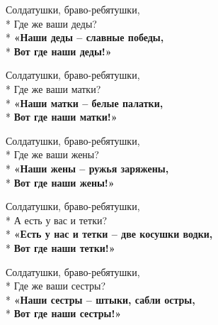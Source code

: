 \begin{minipage}{\linewidth}
Солдатушки, браво-ребятушки,\\*
Где же ваши деды?\\*
\textbf{«Наши деды – славные победы,}\\*
\textbf{Вот где наши деды!»}\\
\end{minipage}\par\medskip\nobreak

\medskip

\begin{minipage}{\linewidth}
Солдатушки, браво-ребятушки,\\*
Где же ваши матки?\\*
\textbf{«Наши матки – белые палатки,}\\*
\textbf{Вот где наши матки!»}\\
\end{minipage}\par\medskip\nobreak

\medskip

\begin{minipage}{\linewidth}
Солдатушки, браво-ребятушки,\\*
Где же ваши жены?\\*
\textbf{«Наши жены – ружья заряжены,}\\*
\textbf{Вот где наши жены!»}\\
\end{minipage}\par\medskip\nobreak

\medskip

\begin{minipage}{\linewidth}
Солдатушки, браво-ребятушки,\\*
А есть у вас и тетки?\\*
\textbf{«Есть у нас и тетки – две косушки водки,}\\*
\textbf{Вот где наши тетки!»}\\
\end{minipage}\par\medskip\nobreak

\medskip

\begin{minipage}{\linewidth}
Солдатушки, браво-ребятушки,\\*
Где же ваши сестры?\\*
\textbf{«Наши сестры – штыки, сабли остры,}\\*
\textbf{Вот где наши сестры!»}\\
\end{minipage}\par\medskip\nobreak

